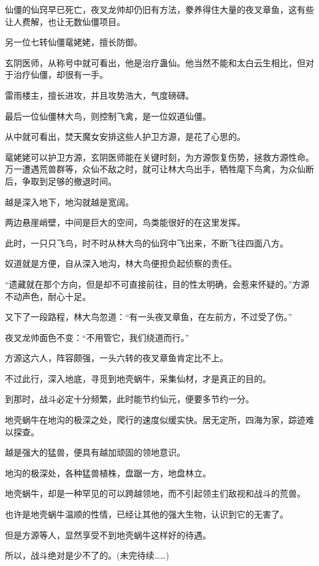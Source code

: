 \begin{this_body}
仙僵的仙窍早已死亡，夜叉龙帅却仍旧有方法，豢养得住大量的夜叉章鱼，这有些让人费解，也让无数仙僵项目。

另一位七转仙僵鼋姥姥，擅长防御。

玄阴医师，从称号中就可看出，他是治疗蛊仙。他当然不能和太白云生相比，但对于治疗仙僵，却很有一手。

雷雨楼主，擅长进攻，并且攻势浩大，气度磅礴。

最后一位仙僵林大鸟，则控制飞禽，是一位奴道仙僵。

从中就可看出，焚天魔女安排这些人护卫方源，是花了心思的。

鼋姥姥可以护卫方源，玄阴医师能在关键时刻，为方源恢复伤势，拯救方源性命。万一遭遇荒兽群等，众仙不敌之时，就可让林大鸟出手，牺牲麾下鸟禽，为众仙断后，争取到足够的撤退时间。

越是深入地下，地沟就越是宽阔。

两边悬崖峭壁，中间是巨大的空间，鸟类能很好的在这里发挥。

此时，一只只飞鸟，时不时从林大鸟的仙窍中飞出来，不断飞往四面八方。

奴道就是方便，自从深入地沟，林大鸟便担负起侦察的责任。

“遗藏就在那个方向，但是却不可直接前往，目的性太明确，会惹来怀疑的。”方源不动声色，耐心十足。

又下了一段路程，林大鸟忽道：“有一头夜叉章鱼，在左前方，不过受了伤。”

夜叉龙帅面色不变：“不用管它，我们绕道而行。”

方源这六人，阵容颇强，一头六转的夜叉章鱼肯定比不上。

不过此行，深入地底，寻觅到地壳蜗牛，采集仙材，才是真正的目的。

到那时，战斗必定十分频繁，此时能节约仙元，便要多节约一分。

地壳蜗牛在地沟的极深之处，爬行的速度似缓实快。居无定所，四海为家，踪迹难以探查。

越是强大的猛兽，便具有越加顽固的领地意识。

地沟的极深处，各种猛兽植株，盘踞一方，地盘林立。

地壳蜗牛，却是一种罕见的可以跨越领地，而不引起领主们敌视和战斗的荒兽。

也许是地壳蜗牛温顺的性情，已经让其他的强大生物，认识到它的无害了。

但是方源等人，显然享受不到地壳蜗牛这样好的待遇。

所以，战斗绝对是少不了的。(未完待续……)

\end{this_body}

